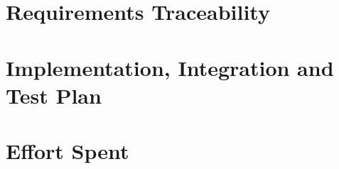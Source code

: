 \documentclass{report}
\begin{document}
\chapter{Requirements Traceability}


\chapter{Implementation, Integration and Test Plan}


\chapter{Effort Spent}
 



\end{document}
